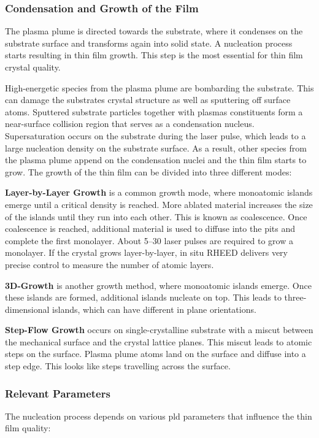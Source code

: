 \subsubsection{Condensation and Growth of the Film}
The plasma plume is directed towards the substrate, where it condenses on 
the substrate surface and transforms again into solid state.
A nucleation process starts resulting in thin film growth. 
This step is the most essential for thin film crystal quality.

High-energetic species from the plasma plume are bombarding the substrate.
This can damage the substrates crystal structure as well as sputtering off 
surface atoms.
Sputtered substrate particles together with plasmas constituents form a near-surface 
collision region that serves as a condensation nucleus. 
Supersaturation occurs on the substrate during the laser pulse, which leads to a
large nucleation density on the substrate surface.
As a result, other species from the plasma plume append on the condensation nuclei and
the thin film starts to grow.
The growth of the thin film can be divided into three different modes:

\textbf{Layer-by-Layer Growth} is a common growth mode, where monoatomic islands 
emerge until a critical density is reached. 
More ablated material increases the size of the islands until they run into each other.
This is known as coalescence. 
Once coalescence is reached, additional material is used to diffuse into the pits and
complete the first monolayer.
About \numrange{5}{30} laser pulses are required to grow a monolayer.
If the crystal grows layer-by-layer, in situ RHEED delivers very precise control to
measure the number of atomic layers. 

\textbf{3D-Growth} is another growth method, where monoatomic islands 
emerge. 
Once these islands are formed, additional islands nucleate on top.
This leads to three-dimensional islands, which can have different in plane orientations.  

\textbf{Step-Flow Growth} occurs on single-crystalline substrate with a miscut between
the mechanical surface and the crystal lattice planes.
This miscut leads to atomic steps on the surface.
Plasma plume atoms land on the surface and diffuse into a step edge.
This looks like steps travelling across the surface.

\subsubsection{Relevant Parameters}
The nucleation process depends on various \ac{pld} parameters that influence
the thin film quality:

